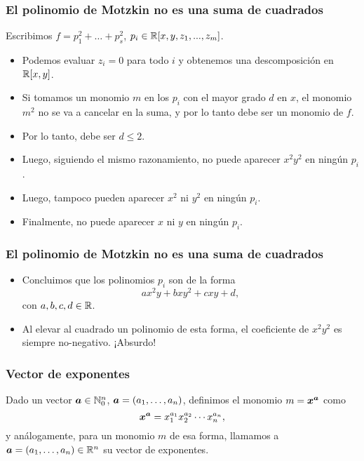 \documentclass[aspectratio=169,12pt,spanish]{beamer}
\begin{document}
\begin{frame}

\frametitle{El polinomio de Motzkin no es una suma de cuadrados}
Escribimos $f = p_1^2 + \dots + p_s^2$, $p_i \in \mathbb{R}[x, y, z_1, ...,z_m]$.

\begin{itemize}
\item Podemos evaluar $z_i=0$ para todo $i$ y obtenemos una descomposición en $\mathbb{R}[x, y]$.
\item Si tomamos un monomio $m$ en los $p_i$ con el mayor grado $d$ en $x$, el monomio $m^2$ no se va a cancelar en la suma, y por lo tanto debe ser un monomio de $f$.
\item Por lo tanto, debe ser $d \le 2$.
\item Luego, siguiendo el mismo razonamiento, no puede aparecer $x^2y^2$ en ningún $p_i$.
\item Luego, tampoco pueden aparecer $x^2$ ni $y^2$ en ningún $p_i$.
\item Finalmente, no puede aparecer $x$ ni $y$ en ningún $p_i$.
\end{itemize}

\end{frame}


\begin{frame}

\frametitle{El polinomio de Motzkin no es una suma de cuadrados}

\begin{itemize}
\item Concluimos que los polinomios $p_i$ son de la forma
$$
a x^2y + b x y^2 + c xy + d,
$$
con $a, b, c, d \in \mathbb{R}$.
\item Al elevar al cuadrado un polinomio de esta forma, el coeficiente de $x^2y^2$ es siempre no-negativo. ¡Absurdo!
\end{itemize}

\end{frame}



\begin{frame}
\frametitle{Vector de exponentes}

Dado un vector $\bm{a} \in \mathbb{N}_0^n$, $\bm{a} = (a_1, \dots, a_n)$, definimos el monomio $m = \bm{x}^{\bm{a}}$ como
$$
\bm{x}^{\bm{a}} = x_1^{a_1} x_2^{a_2} \cdots x_n^{a_n},
$$
y análogamente, para un monomio $m$ de esa forma, llamamos a $\bm{a} = (a_1, \dots, a_n) \in \mathbb{R}^n$ su vector de exponentes.


\end{frame}
\end{document}
